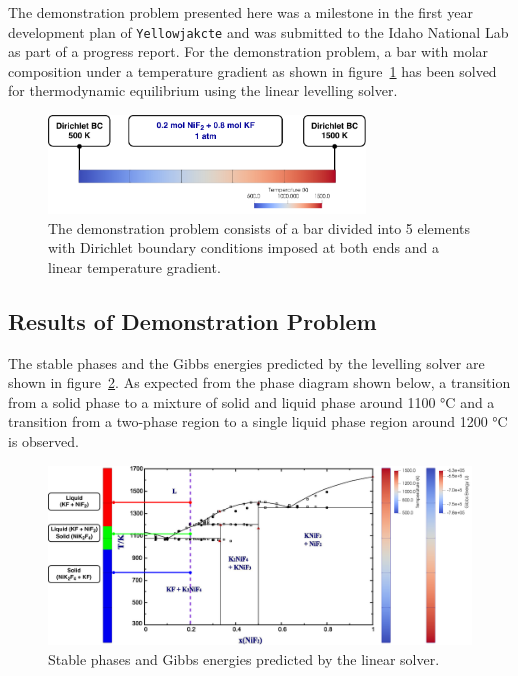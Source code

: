  	The demonstration problem presented here was a milestone in the first year development plan of \texttt{Yellowjakcte} and was submitted to the Idaho National Lab as part of a progress report. For the demonstration problem, a bar with molar composition  under a temperature gradient as shown in figure~\ref{fig:demo_problem} has been solved for thermodynamic equilibrium using the linear levelling solver.

    	\begin{figure}[h]
        		\centering
        		\includegraphics[width=0.75\textwidth]{figures/Demo_prob.pdf}
        		\caption{The demonstration problem consists of a bar divided into 5 elements with Dirichlet boundary conditions imposed at both ends and a linear temperature gradient.}
        		\label{fig:demo_problem}
    	\end{figure}

	\subsection{Results of Demonstration Problem}
	The stable phases and the Gibbs energies predicted by the levelling solver are shown in figure~\ref{fig:results}. As expected from the phase diagram shown below, a transition from a solid phase to a mixture of solid and liquid phase around 1100 \si{\celsius} and a transition from a two-phase region to a single  liquid phase region around 1200 \si{\celsius} is observed.

    	\begin{figure}[h]
        		\centering
        		\includegraphics[width=\textwidth]{figures/Results.pdf}
        		\caption{Stable phases and Gibbs energies predicted by the linear solver.}
        		\label{fig:results}
    	\end{figure}

